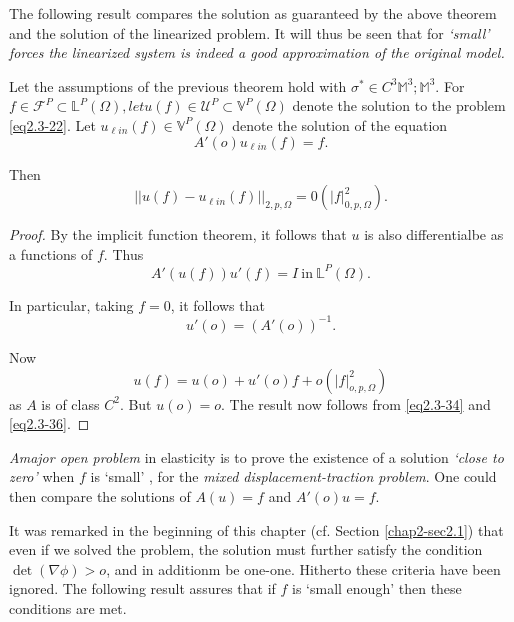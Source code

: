    The following result compares the solution as guaranteed by the
   above theorem and the solution of the linearized problem. It will
   thus be seen that for \textit{`small' forces the linearized system
     is indeed a good
   approximation of the original model.}  


 \begin{theorem}\label{chap2-thm2.3.5}%
   Let the assumptions of the previous theorem hold with $ \sigma^*
   \in C^3 \mathbb{M}^3; \mathbb{M}^3$. For $f \in \mathscr{F} ^P
   \subset \mathbb{L}^P (\Omega ) , let u (f) \in \mathscr{U}^P
   \subset \mathbb{V}^P (\Omega )$ denote the solution to the problem
   \eqref{eq2.3-22}. Let $u_{\ell in}(f)\in \mathbb{V}^P (\Omega )$ denote the
   solution of the equation 
 \begin{equation*}
   A' (o) u_{\ell in}(f) = f. \tag{2.3-34}\label{eq2.3-34}
 \end{equation*} 
 \end{theorem} 

 Then 
 \begin{equation*}
   || u (f) - u _{\ell in} (f) ||_{2, p, \Omega}= 0( |f|^2_{0, p,
     \Omega}). \tag{2.3-35} \label{eq2.3-35}
 \end{equation*} 

\begin{proof}
  By the implicit function theorem, it follows that $u$ is also
  differentialbe as a functions of $f$. Thus  
  $$
  A' (u (f))u' (f)= I ~\text{in}~ \mathbb{L}^P (\Omega ).
  $$

 In particular, taking $f=0$, it follows that 
 \begin{equation*}
   u ' (o) = (A' (o))^{-1}. \tag{2.3-36}\label{eq2.3-36}
 \end{equation*} 


 Now
 $$
 u (f) = u(o) +u' (o)f+ o( |f|^2_{o,p,\Omega})
 $$
 as $A$ is of class $C^2$. But $u(o)=o$. The result now follows from
 \eqref{eq2.3-34} and \eqref{eq2.3-36}. 
 \end{proof}

 
{\em A\pageoriginale major open problem} in elasticity is to prove the
existence of a 
solution {\em `close to zero'} when $f$ is `small' , for the {\em mixed
displacement-traction problem}. One could then compare the solutions of
$A(u) =f $ and $A'(o)u=f$. 
 
It was remarked in the beginning of this chapter
(cf. Section \ref{chap2-sec2.1}) 
that even if we solved the problem, the solution must further satisfy
the condition $\det (\nabla \phi)> o$, and in additionm be
one-one. Hitherto these criteria have been ignored. The following
result assures that if $f$ is `small enough' then these conditions are
met. 
 

